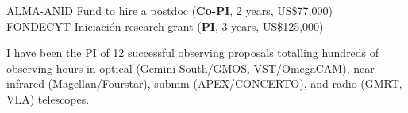 \documentclass[11pt]{article}
\begin{document}



\hline



\noindent
{} ALMA-ANID Fund to hire a postdoc (\textbf{Co-PI}, 2 years, US\$77,000)\\
 FONDECYT Iniciaci\'on research grant (\textbf{PI}, 3 years, US\$125,000)



%

\noindent
I have been the PI of 12 successful observing proposals totalling hundreds of 
observing hours in optical (Gemini-South/GMOS, VST/OmegaCAM), near-infrared 
(Magellan/Fourstar), submm (APEX/CONCERTO), and radio (GMRT, VLA) telescopes.
\end{document}
